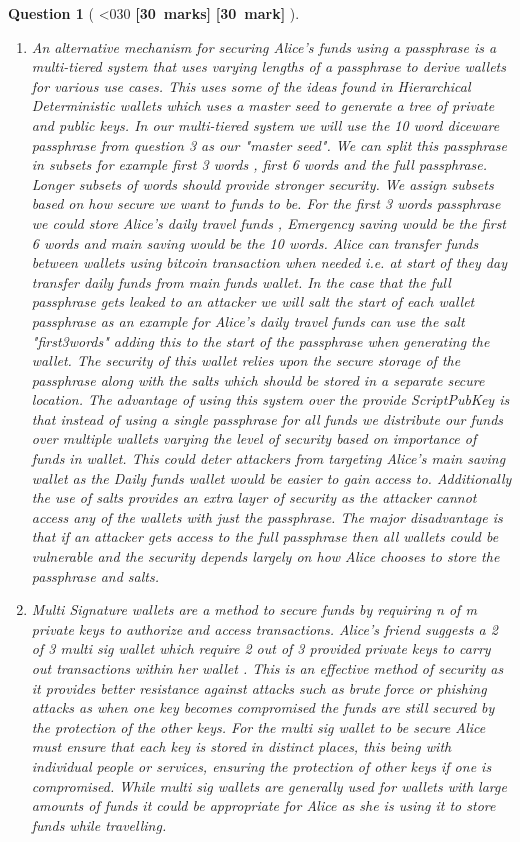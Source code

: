 \documentclass[a4paper]{article}
\theoremstyle{que}
\newtheorem{question}{Question}
\newcommand\points[1]{%
\ifnum1<0#1\relax%
    {\bf \small [#1~marks]}%
  \else%
    {\bf \small [#1~mark]}%
  \fi%
}%
\begin{document}
\begin{question}[\points{30}]
\begin{enumerate}[label=(\alph*)]
    \item An alternative mechanism for securing Alice's funds using a passphrase is a multi-tiered system that uses varying lengths of a passphrase to derive wallets for various use cases. This uses some of the ideas found in Hierarchical Deterministic wallets \cite{BIP32} which uses a master seed to generate a tree of private and public keys. In our multi-tiered system we will use the 10 word diceware passphrase from question 3 as our "master seed". We can split this passphrase in subsets for example first 3 words , first 6 words and the full passphrase. Longer subsets of words should provide stronger security. We assign subsets based on how secure we want to funds to be. For the first 3 words passphrase we could store Alice's daily travel funds , Emergency saving would be the first 6 words and main saving would be the 10 words. Alice can transfer funds between wallets using bitcoin transaction when needed i.e. at start of they day transfer daily funds from main funds wallet. In the case that the full passphrase gets leaked to an attacker we will salt the start of each wallet passphrase as an example for Alice's daily travel funds can use the salt "first3words" adding this to the start of the passphrase when generating the wallet. The security of this wallet relies upon the secure storage of the passphrase along with the salts which should be stored in a separate secure location. The advantage of using this system over the provide ScriptPubKey is that instead of using a single passphrase for all funds we distribute our funds over multiple wallets varying the level of security based on importance of funds in wallet. This could deter attackers from targeting Alice's main saving wallet as the Daily funds wallet would be easier to gain access to. Additionally the use of salts provides an extra layer of security as the attacker cannot access any of the wallets with just the passphrase. The major disadvantage is that if an attacker gets access to the full passphrase then all wallets could be vulnerable and the security depends largely on how Alice chooses to store the passphrase and salts.
    
    \item Multi Signature wallets are a method to secure funds by requiring n of m private keys to authorize and access transactions. Alice's friend suggests a 2 of 3 multi sig wallet which require 2 out of 3 provided private keys to carry out transactions within her wallet \cite{coinbase_multisig_wallet}. This is an effective method of security as it provides better resistance against attacks such as brute force or phishing attacks as when one key becomes compromised the funds are still secured by the protection of the other keys. For the multi sig wallet to be secure Alice must ensure that each key is stored in distinct places, this being with individual people or services, ensuring the protection of other keys if one is compromised. While multi sig wallets are generally used for wallets with large amounts of funds it could be appropriate for Alice as she is using it to store funds while travelling.
    

\end{enumerate}
\end{question}
\end{document}
